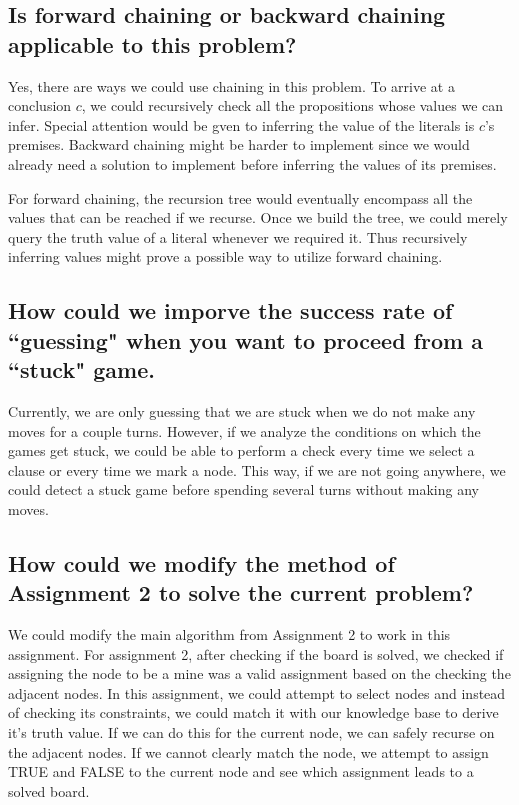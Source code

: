 \documentclass{article}
\begin{document}
	\subsection{Is forward chaining or backward chaining applicable to this problem?}
		Yes, there are ways we could use chaining in this problem. To arrive at a conclusion $c$, we could recursively check all the propositions whose values
		we can infer. Special attention would be gven to inferring the value of 
		the literals is $c$'s premises. Backward chaining might be harder to implement
		since we would already need a solution to implement before inferring the 
		values of its premises.

		For forward chaining, the recursion tree would eventually encompass all the 
		values that can be reached if we recurse. Once we build the tree, we could 
		merely query the truth value of a literal whenever we required it. Thus 
		recursively inferring values might prove a possible way to utilize forward 
		chaining.
	\subsection{How could we imporve the success rate of ``guessing" when you want to proceed from a
			``stuck" game.}
		Currently, we are only guessing that we are stuck when we do not make any moves for a couple
		turns. However, if we analyze the conditions on which the games get stuck, we could be able
		to perform a check every time we select a clause or every time we mark a node. This way, 
		if we are not going anywhere, we could detect a stuck game before spending several turns
		without making any moves.

	\subsection{How could we modify the method of Assignment 2 to solve the current problem?}
		We could modify the main algorithm from Assignment 2 to work in this assignment. For assignment
		2, after checking if the board is solved, we checked if assigning the node to be a mine was a 
		valid assignment based on the checking the adjacent nodes. In this assignment, we could attempt
		to select nodes and instead of checking its constraints, we could match it with our knowledge base
		to derive it's truth value. If we can do this for the current node, we can safely recurse on the
		adjacent nodes. If we cannot clearly match the node, we attempt to assign TRUE and FALSE to the 
		current node and see which assignment leads to a solved board.
\end{document}
